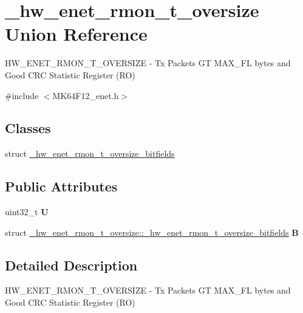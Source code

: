\hypertarget{union__hw__enet__rmon__t__oversize}{}\section{\+\_\+hw\+\_\+enet\+\_\+rmon\+\_\+t\+\_\+oversize Union Reference}
\label{union__hw__enet__rmon__t__oversize}


H\+W\+\_\+\+E\+N\+E\+T\+\_\+\+R\+M\+O\+N\+\_\+\+T\+\_\+\+O\+V\+E\+R\+S\+I\+ZE -\/ Tx Packets GT M\+A\+X\+\_\+\+FL bytes and Good C\+RC Statistic Register (RO)  




{\ttfamily \#include $<$M\+K64\+F12\+\_\+enet.\+h$>$}

\subsection*{Classes}
\begin{DoxyCompactItemize}
\item 
struct \hyperlink{struct__hw__enet__rmon__t__oversize_1_1__hw__enet__rmon__t__oversize__bitfields}{\+\_\+hw\+\_\+enet\+\_\+rmon\+\_\+t\+\_\+oversize\+\_\+bitfields}
\end{DoxyCompactItemize}
\subsection*{Public Attributes}
\begin{DoxyCompactItemize}
\item 
uint32\+\_\+t {\bfseries U}\hypertarget{union__hw__enet__rmon__t__oversize_a669d62ae273408c21c69398b4f92c89b}{}\label{union__hw__enet__rmon__t__oversize_a669d62ae273408c21c69398b4f92c89b}

\item 
struct \hyperlink{struct__hw__enet__rmon__t__oversize_1_1__hw__enet__rmon__t__oversize__bitfields}{\+\_\+hw\+\_\+enet\+\_\+rmon\+\_\+t\+\_\+oversize\+::\+\_\+hw\+\_\+enet\+\_\+rmon\+\_\+t\+\_\+oversize\+\_\+bitfields} {\bfseries B}\hypertarget{union__hw__enet__rmon__t__oversize_aabcfd22e2cd0fb3edf3ce84f1f340217}{}\label{union__hw__enet__rmon__t__oversize_aabcfd22e2cd0fb3edf3ce84f1f340217}

\end{DoxyCompactItemize}


\subsection{Detailed Description}
H\+W\+\_\+\+E\+N\+E\+T\+\_\+\+R\+M\+O\+N\+\_\+\+T\+\_\+\+O\+V\+E\+R\+S\+I\+ZE -\/ Tx Packets GT M\+A\+X\+\_\+\+FL bytes and Good C\+RC Statistic Register (RO) 

